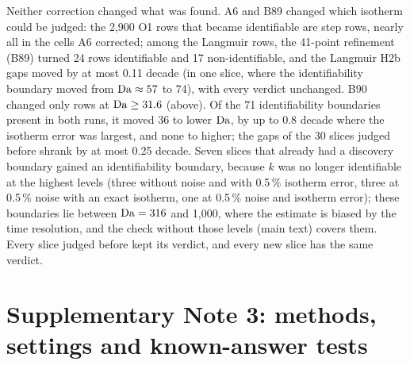 \noindent Neither correction changed what was found. A6 and B89 changed which isotherm could be
judged: the 2,900 O1 rows that became identifiable are step rows, nearly all in the cells A6
corrected; among the Langmuir rows, the 41-point refinement (B89) turned 24 rows identifiable and
17 non-identifiable, and the Langmuir H2b gaps moved by at most 0.11 decade (in one slice, where
the identifiability boundary moved from $\mathrm{Da} \approx 57$ to 74), with every verdict unchanged.
B90 changed only rows at $\mathrm{Da} \ge 31.6$ (above). Of the 71 identifiability boundaries present in
both runs, it moved 36 to lower $\mathrm{Da}$, by up to 0.8 decade where the isotherm error was largest,
and none to higher; the gaps of the 30 slices judged before shrank by at most 0.25 decade. Seven
slices that already had a discovery boundary gained an identifiability boundary, because $k$ was
no longer identifiable at the highest levels (three without noise and with 0.5\,\% isotherm
error, three at 0.5\,\% noise with an exact isotherm, one at 0.5\,\% noise and isotherm error);
these boundaries lie between $\mathrm{Da} = 316$ and 1,000, where the estimate is biased by the time
resolution, and the check without those levels (main text) covers them. Every slice judged
before kept its verdict, and every new slice has the same verdict.

\section*{Supplementary Note 3: methods, settings and known-answer tests}

